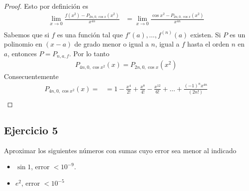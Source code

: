 \documentclass[a4paper]{article}
\begin{document}
\begin{proof}
    Esto por definición es
    \begin{align*}
        \lim_{x \to 0} \frac{f(x^2) - P_{2n, 0, \cos{x}}(x^2)}{x^{4n}} &= 
        \lim_{x \to 0} \frac{\cos{x^2} - P_{2n, 0, \cos{x}}(x^2)}{x^{4n}} \\
    \end{align*}
    Sabemos que si \(f\) es una función tal que \(f'(a), \dotsc, f^{(n)}(a)\) existen. Si 
    \(P\) es un polinomio en \((x-a)\) de grado menor o igual a \(n\), igual a \(f\) 
    hasta el orden \(n\) en \(a\), entonces \(P = P_{n, a, f}\).
    Por lo tanto 
    \begin{align*}
        P_{4n, 0, \cos{x^2}}(x) = P_{2n, 0, \cos{x}}(x^2)
    \end{align*}
    Consecuentemente 
    \begin{align*}
        P_{4n, 0, \cos{x^2}}(x) = &= 1 - \frac{x^4}{2!} + \frac{x^8}{4!} - \frac{x^{12}}{6!} + \dotsc + \frac{(-1)^{n}x^{4n}}{(2n!)} \\
    \end{align*}
\end{proof}
\newpage
\subsection{Ejercicio 5}
\noindent
Aproximar los siguientes números con sumas cuyo error sea menor al indicado
\begin{itemize}
    \item \(\sin{1}\), error \(< 10^{-9}\).
    \item \(e^{2}\), error \(< 10^{-5}\)
\end{itemize}
\end{document}
